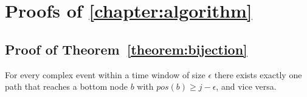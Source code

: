 \chapter{Proofs of \cref{chapter:algorithm}}\label{appendix:A}

\section{Proof of Theorem~\ref{theorem:bijection}}\label{appendix:A:sec:1}

\begin{theorem}
For every complex event within a time window of size $\epsilon$ there exists exactly one path that reaches a bottom node $b$ with $pos(b) \ge j - \epsilon$, and vice versa.
\end{theorem}

